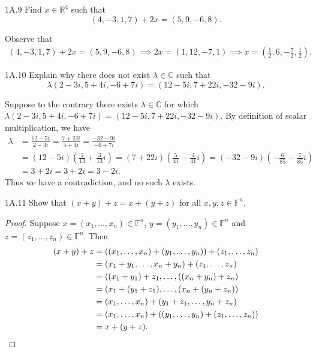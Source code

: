 \documentclass{exam}
\newcommand{\paren}[1]{\left(#1\right)}
\begin{document}
\begin{problem}{1A.9}
    Find $x\in\mathbb R^4$ such that $$(4, -3, 1, 7)+2x=(5,9,-6,8).$$    
\end{problem}

Observe that
\begin{align*}
    (4, -3, 1, 7)+2x=(5,9,-6,8) \implies 2x = (1,12,-7,1) \implies x = \paren{\frac12,6,-\frac72,\frac12}.
\end{align*}

\begin{problem}{1A.10}
    Explain why there does not exist $\lambda\in\mathbb C$ such that $$\lambda(2-3i,5+4i,-6+7i) = (12-5i,7+22i,-32-9i).$$
\end{problem}

Suppose to the contrary there exists $\lambda\in\mathbb C$ for which $\lambda(2-3i,5+4i,-6+7i) = (12-5i,7+22i,-32-9i)$. By definition of scalar multiplication, we have
\begin{align*}
    \lambda &= \frac{12-5i}{2-3i} = \frac{7+22i}{5+4i} = \frac{-32-9i}{-6+7i}\\
    &= (12-5i)\paren{\frac2{13}+\frac3{13}i}=(7+22i)\paren{\frac5{41}-\frac4{41}i}=(-32-9i)\paren{-\frac{6}{85}-\frac7{85}i}\\
    &=3+2i = 3+2i = 3-2i.
\end{align*}
Thus we have a contradiction, and no such $\lambda$ exists.

\begin{problem}{1A.11}
    Show that $(x+y)+z=x+(y+z)$ for all $x,y,z\in\mathbb F^n$.
\end{problem}

\begin{proof}
    Suppose $x = (x_1,\dots,x_n)\in\mathbb F^n$, $y = (y_1,\dots,y_n)\in\mathbb F^n$ and $z=(z_1,\dots, z_n)\in\mathbb F^n$. Then
    \begin{align*}
        (x + y) + z &= ((x_1,\dots,x_n) + (y_1,\dots,y_n)) + (z_1,\dots,z_n)\\
        &=(x_1+y_1,\dots,x_n+y_n) + (z_1,\dots,z_n)\\
        &=((x_1+y_1)+z_1,\dots,((x_n+y_n)+z_n)\\
        &=(x_1+(y_1+z_1),\dots,(x_n+(y_n+z_n))\\
        &=(x_1,\dots,x_n) + (y_1+z_1,\dots,y_n+z_n)\\
        &=(x_1,\dots,x_n)+((y_1,\dots,y_n) + (z_1,\dots,z_n))\\
        &=x+(y+z).\qedhere
    \end{align*}
\end{proof}
\end{document}
